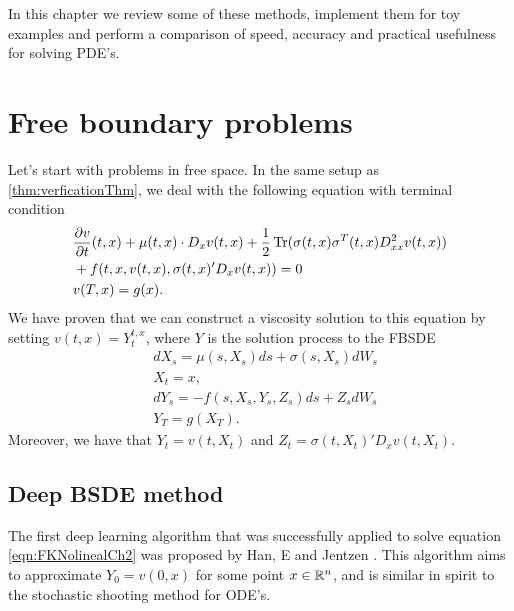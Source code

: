 In this chapter we review some of these methods, implement them for toy examples and perform a comparison of speed, accuracy and practical usefulness for solving PDE's.   

\section{Free boundary problems}
Let's start with problems in free space. In the same setup as \autoref{thm:verficationThm}, we deal with the following equation with terminal condition
\begin{equation}
	\label{eqn:FKNolinealCh2}
	\begin{split}
		&\frac{\partial v}{\partial t}(t,x)+\mu(t,x)\cdot D_x v(t,x)+\frac{1}{2}\operatorname{Tr}(\sigma(t,x)\sigma^{T}(t,x)D_{xx}^2v(t,x))\\
		&+f(t,x,v(t,x),\sigma(t,x)' D_x v(t,x))=0\\
		&v(T,x)=g(x).
	\end{split}
\end{equation}
We have proven that we can construct a viscosity solution to this equation by setting $v(t,x)=Y_{t}^{t,x}$, where $Y$ is the solution process to the FBSDE
\begin{equation}
	\label{eqn:UncoupledCh2}
	\begin{split}
		&dX_s=\mu(s,X_s)ds+\sigma(s,X_s)dW_s\\
		&X_t=x,\\
		&dY_s=-f(s,X_s,Y_s,Z_s)ds+Z_s dW_s\\
		&Y_T=g(X_T).
	\end{split}
\end{equation}
Moreover, we have that $Y_t=v(t,X_t)$ and $Z_t=\sigma(t,X_t)'D_x v(t,X_t)$.
\subsection{Deep BSDE method}
The first deep learning algorithm that was successfully applied to solve equation \eqref{eqn:FKNolinealCh2} was proposed by Han, E and Jentzen \cite{han_solving_2018,e_deep_2017}. This algorithm aims to approximate $Y_0=v(0,x)$ for some point $x\in \mathbb{R}^n$, and is similar in spirit to the stochastic shooting method for ODE's.

